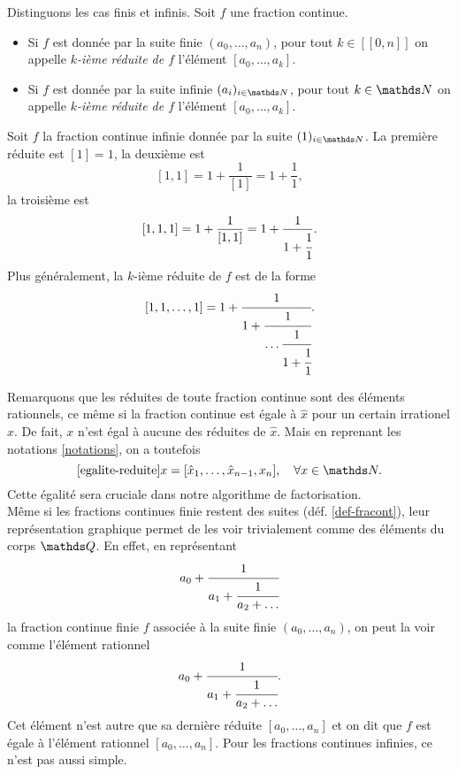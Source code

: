 \begin{definition}
	Distinguons les cas finis et infinis. Soit $f$ une fraction
	continue.
	\begin{itemize}
		\item Si $f$ est donnée par la suite finie $(a_0, \dots, a_n)$, pour
		tout $k\in [\![0, n]\!]$ on appelle \emph{$k$-ième réduite de $f$}
		l'élément $[a_0, \dots, a_k]$.
		\item Si $f$ est donnée par la suite infinie $(a_i)_{i\in \N}$, pour
		tout $k\in \N$ on appelle \emph{$k$-ième réduite de $f$} l'élément
		$[a_0, \dots, a_k]$.
	\end{itemize}
\end{definition}

\begin{exemple}
	Soit $f$ la fraction continue infinie donnée par la suite $(1)_{i\in \N}$.
	La première réduite est $[1] = 1$, la deuxième est \[[1, 1] = 1 +
	\frac{1}{[1]} = 1 + \frac{1}{1},\] la troisième est \[[1, 1, 1] = 1 +
	\frac{1}{[1, 1]} = 1 + \frac{1}{1 + \cfrac{1}{1}}.\] Plus généralement, la
	$k$-ième réduite de $f$ est de la forme \[[1, 1, \dots, 1] = 1 +
	\cfrac{1}{1 + \cfrac{1}{\dots \\ \cfrac{1}{1 +
	\cfrac{1}{1}}}}.\]
\end{exemple}

Remarquons que les réduites de toute fraction continue sont des éléments
rationnels, ce même si la fraction continue est égale à $\hat{x}$ pour un
certain irrationel $x$. De fait, $x$ n'est égal à aucune des réduites de
$\hat{x}$. Mais en reprenant les notations \ref{notations}, on a toutefois
\begin{equation}\ref{egalite-reduite}
	x = [\hat{x}_1, \dots, \hat{x}_{n-1}, x_n], \quad \forall x\in \N.
\end{equation}
Cette égalité sera cruciale dans notre algorithme de factorisation. \\

Même si les fractions continues finie restent des suites (déf.
\ref{def-fracont}), leur représentation graphique permet de les voir
trivialement comme des éléments du corps $\Q$. En effet, en représentant \[a_0
+ \cfrac{1}{a_1 + \cfrac{1}{a_2 + \dots}}\] la fraction continue finie $f$
associée à la suite finie $(a_0, \dots, a_n)$, on peut la voir comme l'élément
rationnel \[a_0 + \cfrac{1}{a_1 + \cfrac{1}{a_2 + \dots}}.\] Cet élément n'est
autre que sa dernière réduite $[a_0, \dots, a_n]$ et on dit que $f$ est égale à
l'élément rationnel $[a_0, \dots, a_n]$. Pour les fractions continues infinies,
ce n'est pas aussi simple.


